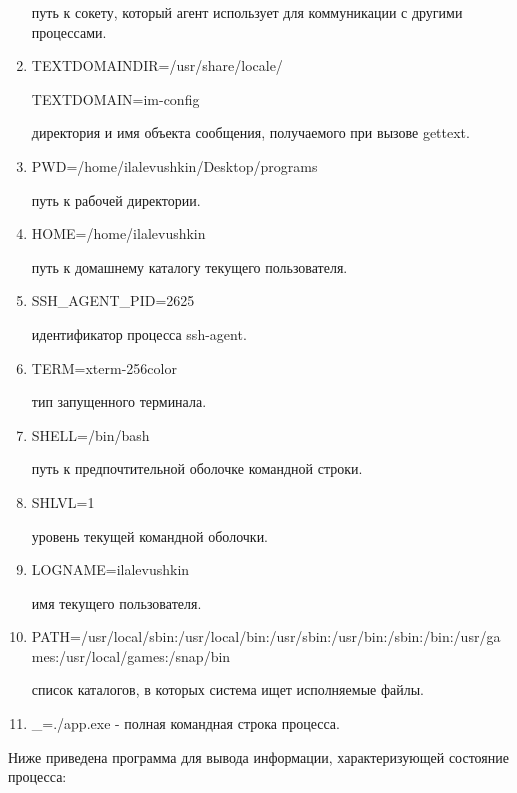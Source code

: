 \documentclass[a4paper,12pt]{article}
\begin{document}
\begin{enumerate}
		путь к сокету, который агент использует для коммуникации с другими процессами.
		\item TEXTDOMAINDIR=/usr/share/locale/
		
		TEXTDOMAIN=im-config
		
		директория и имя объекта сообщения, получаемого при вызове gettext.
		\item PWD=/home/ilalevushkin/Desktop/programs
		
		путь к рабочей директории.
		\item HOME=/home/ilalevushkin
		
		путь к домашнему каталогу текущего пользователя.
		\item SSH\_AGENT\_PID=2625
		
		идентификатор процесса ssh-agent.
		\item TERM=xterm-256color
		
		тип запущенного терминала.
		\item SHELL=/bin/bash
		
		путь к предпочтительной оболочке командной строки.
		\item SHLVL=1
		
		уровень текущей командной оболочки.
		\item LOGNAME=ilalevushkin
		
		имя текущего пользователя.
		\item PATH=/usr/local/sbin:/usr/local/bin:/usr/sbin:/usr/bin:/sbin:/bin:/usr/games:/usr/local/games:/snap/bin
		
		список каталогов, в которых система ищет исполняемые файлы.
		\item \_=./app.exe - полная командная строка процесса.
	\end{enumerate}

	Ниже приведена программа для вывода информации, характеризующей состояние процесса:
	
\end{document}
